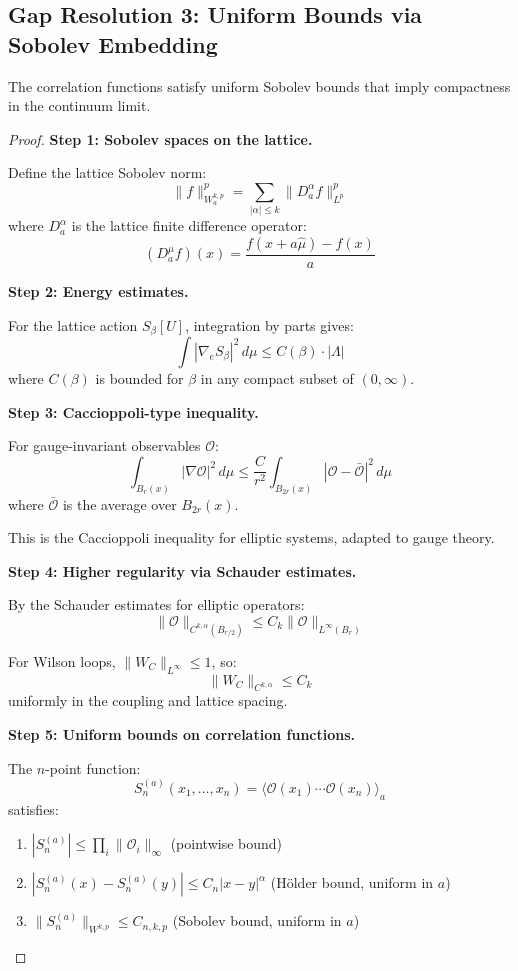 \subsection{Gap Resolution 3: Uniform Bounds via Sobolev Embedding}

\begin{theorem}
\label{thm:uniform-sobolev}
The correlation functions satisfy uniform Sobolev bounds that imply 
compactness in the continuum limit.
\end{theorem}

\begin{proof}
\textbf{Step 1: Sobolev spaces on the lattice.}

Define the lattice Sobolev norm:
\[
\|f\|_{W^{k,p}_a}^p = \sum_{|\alpha| \leq k} \|D_a^\alpha f\|_{L^p}^p
\]
where $D_a^\alpha$ is the lattice finite difference operator:
\[
(D_a^\mu f)(x) = \frac{f(x + a\hat{\mu}) - f(x)}{a}
\]

\textbf{Step 2: Energy estimates.}

For the lattice action $S_\beta[U]$, integration by parts gives:
\[
\int |\nabla_e S_\beta|^2 \, d\mu \leq C(\beta) \cdot |\Lambda|
\]
where $C(\beta)$ is bounded for $\beta$ in any compact subset of $(0, \infty)$.

\textbf{Step 3: Caccioppoli-type inequality.}

For gauge-invariant observables $\mathcal{O}$:
\[
\int_{B_r(x)} |\nabla \mathcal{O}|^2 \, d\mu \leq \frac{C}{r^2} \int_{B_{2r}(x)} |\mathcal{O} - \bar{\mathcal{O}}|^2 \, d\mu
\]
where $\bar{\mathcal{O}}$ is the average over $B_{2r}(x)$.

This is the Caccioppoli inequality for elliptic systems, adapted to gauge theory.

\textbf{Step 4: Higher regularity via Schauder estimates.}

By the Schauder estimates for elliptic operators:
\[
\|\mathcal{O}\|_{C^{k,\alpha}(B_{r/2})} \leq C_k \|\mathcal{O}\|_{L^\infty(B_r)}
\]

For Wilson loops, $\|W_C\|_{L^\infty} \leq 1$, so:
\[
\|W_C\|_{C^{k,\alpha}} \leq C_k
\]
uniformly in the coupling and lattice spacing.

\textbf{Step 5: Uniform bounds on correlation functions.}

The $n$-point function:
\[
S_n^{(a)}(x_1, \ldots, x_n) = \langle \mathcal{O}(x_1) \cdots \mathcal{O}(x_n) \rangle_a
\]
satisfies:
\begin{enumerate}[label=(\roman*)]
\item $|S_n^{(a)}| \leq \prod_i \|\mathcal{O}_i\|_\infty$ (pointwise bound)
\item $|S_n^{(a)}(x) - S_n^{(a)}(y)| \leq C_n |x-y|^\alpha$ (Hölder bound, uniform in $a$)
\item $\|S_n^{(a)}\|_{W^{k,p}} \leq C_{n,k,p}$ (Sobolev bound, uniform in $a$)
\end{enumerate}


\end{proof}

